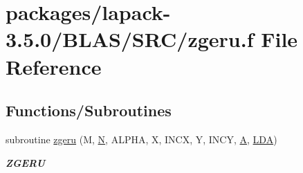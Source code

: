 \hypertarget{lapack-3_85_80_2BLAS_2SRC_2zgeru_8f}{}\section{packages/lapack-\/3.5.0/\+B\+L\+A\+S/\+S\+R\+C/zgeru.f File Reference}
\label{lapack-3_85_80_2BLAS_2SRC_2zgeru_8f}
\subsection*{Functions/\+Subroutines}
\begin{DoxyCompactItemize}
\item 
subroutine \hyperlink{group__complex16__blas__level2_ga7d9c75aa8d9865d271db9ced1d08d097}{zgeru} (M, \hyperlink{polmisc_8c_a0240ac851181b84ac374872dc5434ee4}{N}, A\+L\+P\+H\+A, X, I\+N\+C\+X, Y, I\+N\+C\+Y, \hyperlink{classA}{A}, \hyperlink{example__user_8c_ae946da542ce0db94dced19b2ecefd1aa}{L\+D\+A})
\begin{DoxyCompactList}\small\item\em {\bfseries Z\+G\+E\+R\+U} \end{DoxyCompactList}\end{DoxyCompactItemize}
